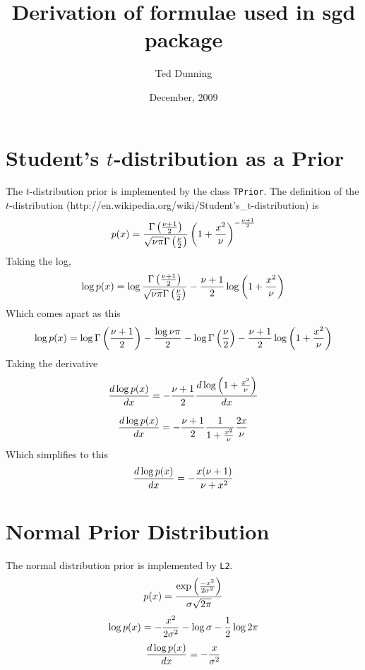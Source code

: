 \documentclass[11pt]{article}
\title{Derivation of formulae used in sgd package}
\author{Ted Dunning}
\date{December, 2009}                                           %
\begin{document}
\maketitle

\section{Student's $t$-distribution as a Prior}
The $t$-distribution prior is implemented by the class {\tt TPrior}. The definition of the $t$-distribution (http://en.wikipedia.org/wiki/Student's\_t-distribution) is
\begin{equation*}
p(x) = {\Gamma \left({\nu + 1 \over 2} \right) \over {\sqrt{\nu \pi} \Gamma \left( {\nu \over 2} \right) } }
\left( 1 + {x^2 \over \nu} \right)^{- {\nu+1 \over 2}}
\end{equation*}
Taking the log,
\begin{equation*}
\log p(x) = \log {\Gamma \left({\nu + 1 \over 2} \right) \over {\sqrt{\nu \pi} \Gamma \left( {\nu \over 2} \right) } }
- {\nu+1 \over 2} \log \left( 1 + {x^2 \over \nu} \right)
\end{equation*}
Which comes apart as this
\begin{equation*}
\log p(x) = \log {\Gamma \left({\nu + 1 \over 2} \right)} - {\log {\nu \pi} \over 2} - \log \Gamma \left( {\nu \over 2} \right) 
- {\nu+1 \over 2} \log \left( 1 + {x^2 \over \nu} \right)
\end{equation*}
Taking the derivative
\begin{equation*}
{d \log p(x) \over d x} =  
- {\nu+1 \over 2} {d \log \left( 1 + {x^2 \over \nu} \right) \over d x}
\end{equation*}

\begin{equation*}
{d \log p(x) \over d x} =  
- {\nu+1 \over 2} {1 \over 1 + {x^2 \over \nu}}{{2 x \over \nu}}
\end{equation*}
Which simplifies to this
\begin{equation*}
{d \log p(x) \over d x} =  
- {x (\nu+1) \over \nu + {x^2 }} 
\end{equation*}

\section{Normal Prior Distribution}
The normal distribution prior is implemented by {\tt L2}.
\begin{equation*}
p(x) = {\exp \left({-x^2 \over 2  \sigma^2} \right) \over \sigma \sqrt{2  \pi}} 
\end{equation*}
\begin{equation*}
\log p(x) = -{x^2 \over 2  \sigma^2} - \log \sigma - {1 \over 2}\log{2  \pi } 
\end{equation*}
\begin{equation*}
{d \log p(x) \over dx} = -{ x \over   \sigma^2} 
\end{equation*}
\end{document}
